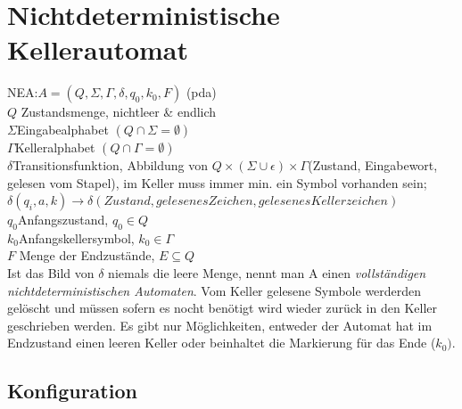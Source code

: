 \section{Nichtdeterministische Kellerautomat}

NEA:$A=(Q,\Sigma,\Gamma,\delta,q_{0},k_{0},F)$ (pda)\\
$Q$ Zustandsmenge, nichtleer \& endlich\\
$\Sigma$Eingabealphabet $(Q\cap\Sigma=\emptyset)$\\
$\Gamma$Kelleralphabet $(Q\cap\Gamma=\emptyset)$\\
$\delta$Transitionsfunktion, Abbildung von $Q\times(\Sigma\cup\epsilon)\times\Gamma$(Zustand,
Eingabewort, gelesen vom Stapel), im Keller muss immer min. ein Symbol
vorhanden sein; $\delta(q_{i},a,k)\rightarrow\delta(Zustand,gelesenesZeichen,gelesenesKellerzeichen)$
\\
$q_{0}$Anfangszustand, $q_{0}\in Q$\\
$k_{0}$Anfangskellersymbol, $k_{0}\in\Gamma$\\
$F$ Menge der Endzustände, $E\subseteq Q$\\
Ist das Bild von $\delta$ niemals die leere Menge, nennt man A einen
\emph{vollständigen nichtdeterministischen Automaten}. Vom Keller
gelesene Symbole werderden gelöscht und müssen sofern es nocht benötigt
wird wieder zurück in den Keller geschrieben werden. Es gibt nur Möglichkeiten,
entweder der Automat hat im Endzustand einen leeren Keller oder beinhaltet
die Markierung für das Ende ($k_{0})$.


\subsection{Konfiguration}

